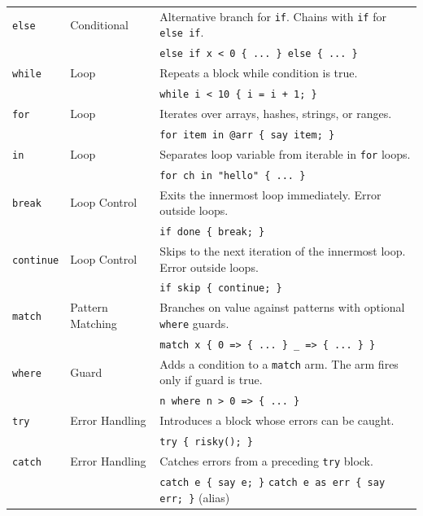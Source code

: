 \begin{longtable}{@{}llp{8cm}@{}}
\texttt{else} & Conditional &
Alternative branch for \texttt{if}. Chains with \texttt{if} for \texttt{else if}.\\
& & \texttt{else if x < 0 \{ ... \} else \{ ... \}} \\

\texttt{while} & Loop &
Repeats a block while condition is true.\\
& & \texttt{while i < 10 \{ i = i + 1; \}} \\

\texttt{for} & Loop &
Iterates over arrays, hashes, strings, or ranges.\\
& & \texttt{for item in @arr \{ say item; \}} \\

\texttt{in} & Loop &
Separates loop variable from iterable in \texttt{for} loops.\\
& & \texttt{for ch in "hello" \{ ... \}} \\

\texttt{break} & Loop Control &
Exits the innermost loop immediately. Error outside loops.\\
& & \texttt{if done \{ break; \}} \\

\texttt{continue} & Loop Control &
Skips to the next iteration of the innermost loop. Error outside loops.\\
& & \texttt{if skip \{ continue; \}} \\

\texttt{match} & Pattern Matching &
Branches on value against patterns with optional \texttt{where} guards.\\
& & \texttt{match x \{ 0 => \{ ... \} \_ => \{ ... \} \}} \\

\texttt{where} & Guard &
Adds a condition to a \texttt{match} arm. The arm fires only if guard is true.\\
& & \texttt{n where n > 0 => \{ ... \}} \\

\texttt{try} & Error Handling &
Introduces a block whose errors can be caught.\\
& & \texttt{try \{ risky(); \}} \\

\texttt{catch} & Error Handling &
Catches errors from a preceding \texttt{try} block.\\
& & \texttt{catch e \{ say e; \}} \hspace{1em} \texttt{catch e as err \{ say err; \}} (alias) \\


\end{longtable}
